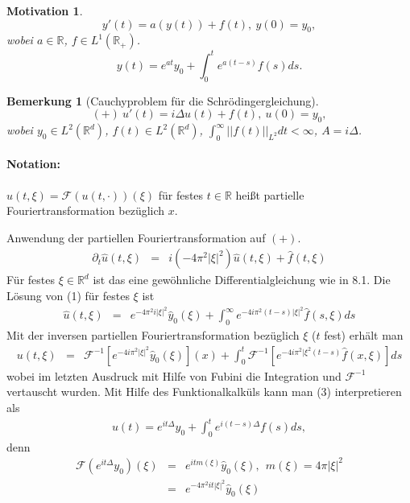 \documentclass[11pt,a4paper,titlepage, ngerman]{scrartcl}
\newtheorem{Bemerkung}[Satz]{Bemerkung}
\newtheorem{Motivation}[Satz]{Motivation}
\numberwithin{equation}{section}
\newcommand{\R}{\mathbb{R}} %
\newcommand{\f}{\hat{f}}
\newcommand{\F}{\mathcal{F}}
\newcommand{\m}{\cdot}
\newcommand{\laplace}{\Delta}
\begin{document}
	\begin{Motivation}
		$$y'(t) = a(y(t))+ f(t), ~y(0) = y_0,$$
		wobei $a\in \R$, $f\in L^1(\R_+)$.
		$$y(t) = e^{at}y_0+\int_{0}^{t}e^{a(t-s)}f(s)ds.$$
	\end{Motivation}
	
	\begin{Bemerkung}[Cauchyproblem für die Schrödingergleichung]
		$$(+)~u'(t) = i\laplace u(t) +f(t),~ u(0) = y_0,$$
		wobei $y_0\in L^2(\R^d)$, $f(t)\in L^2(\R^d)$, $\int_{0}^{\infty}||f(t)||_{L^2}dt<\infty$, $A = i\laplace$.
	\end{Bemerkung}
	
	\paragraph{Notation:} $\hat{u}(t,\xi)  =\F(u(t,\m))(\xi)$ für festes $t\in \R$ heißt partielle Fouriertransformation bezüglich $x$.
	
	Anwendung der partiellen Fouriertransformation auf $(+)$.
	\begin{eqnarray}
		\partial_t \hat u(t,\xi) &=& i(-4\pi^2|\xi|^2)\hat u(t,\xi) +\f(t,\xi) 
	\end{eqnarray}
	Für festes $\xi\in \R^d$ ist das eine gewöhnliche Differentialgleichung wie in 8.1. Die Lösung von (1) für festes $\xi$ ist
	\begin{eqnarray}
		\hat u(t,\xi) &=& e^{-4\pi^2i|\xi|^2}\hat{y}_0(\xi)+\int_{0}^{\infty} e^{-4i\pi^2(t-s)|\xi|^2}\f(s,\xi)ds
	\end{eqnarray}
	Mit der inversen partiellen Fouriertransformation bezüglich $\xi$ ($t$ fest) erhält man
	\begin{eqnarray}
		u(t,\xi) &=& \F^{-1}\left[e^{-4i\pi^2|\xi|^2}\hat{y}_0(\xi) \right](x) +\int_{0}^{t}\F^{-1}\left[e^{-4i\pi^2|\xi^2(t-s)}\f(x,\xi)\right]ds
	\end{eqnarray}
	wobei im letzten Ausdruck mit Hilfe von Fubini die Integration und $\F^{-1}$ vertauscht wurden. Mit Hilfe des Funktionalkalküls kann man (3) interpretieren als
	\begin{eqnarray}
		\boxed{u(t) = e^{it\laplace}y_0 +\int_0^t e^{i(t-s)\laplace}f(s) ds,}
	\end{eqnarray}
	denn
	\begin{eqnarray}
		\F(e^{it\laplace}y_0)(\xi) &=& e^{itm(\xi)}\hat{y}_0(\xi),~~ m(\xi) = 4\pi|\xi|^2\nonumber\\
		&=& e^{-4\pi^2 it|\xi|^2}\hat{y}_0(\xi)\nonumber
	\end{eqnarray}
	
\end{document}
